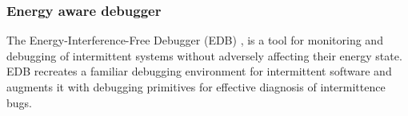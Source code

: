 \documentclass[]{article}
\begin{document}
\subsubsection{Energy aware debugger}
The Energy-Interference-Free Debugger (EDB) \cite{edb}, is a tool for monitoring and debugging of intermittent systems without adversely affecting their energy state. EDB recreates a familiar debugging environment for intermittent software and augments it with debugging primitives for effective diagnosis of intermittence bugs.



\end{document}
